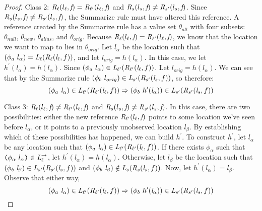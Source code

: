 \begin{proof}
Class 2: $\emph{R}_\ell ( l_\ell,  \emph{f}) = \emph{R}_{\ell^\prime} ( l_\ell,  \emph{f})$ and $\emph{R}_{s} ( l_s,  \emph{f}) \neq \emph{R}_{s^\prime} ( l_s,  \emph{f})$. Since $\emph{R}_{s} ( l_s,  \emph{f}) \neq \emph{R}_{s^\prime} ( l_s,  \emph{f})$, the Summarize rule must have altered this reference. A reference created by the Summarize rule has a value set $\theta_{all}$ with four subsets: $\theta_{null}$, $\theta_{new}$, $\theta_{alias}$, and $\theta_{orig}$. Because $\emph{R}_\ell ( l_\ell,  \emph{f}) = \emph{R}_{\ell^\prime} ( l_\ell,  \emph{f})$, we know that the location we want to map to lies in $\theta_{orig}$. Let $l_\alpha$ be the location such that ${(\phi_a\ l_\alpha)} = \cfgnt{L}_{\ell}(\cfgnt{R}_{\ell} (\cfgnt{l}_\ell,f )) $, and let $l_{orig} = h(l_\alpha)$. In this case, we let $h^\prime(l_\alpha) = h(l_\alpha)$. Since $(\phi_a\ l_\alpha) \in \emph{L}_{\ell^\prime}(\emph{R}_{\ell^\prime} (\emph{l}_\ell,f ))$. Let $l_{orig} = h(l_\alpha)$. We can see that by the Summarize rule $ (\phi_b\ l_{orig})\in \emph{L}_{s^\prime}(\emph{R}_{s^\prime} (\emph{l}_s,f ))$, so therefore:
$$(\phi_a\ \cfgnt{l}_\alpha) \in \cfgnt{L}_{\ell^\prime}(\cfgnt{R}_{\ell^\prime} (\cfgnt{l}_\ell,f )) \Rightarrow (\phi_b\ h^\prime (\cfgnt{l}_\alpha))\in \cfgnt{L}_{s^\prime}(\cfgnt{R}_{s^\prime} (\cfgnt{l}_s,f ))$$

Class 3: $\emph{R}_\ell ( l_\ell,  \emph{f}) \neq \emph{R}_{\ell^\prime} ( l_\ell,  \emph{f})$ and $\emph{R}_{s} ( l_s,  \emph{f}) \neq \emph{R}_{s^\prime} ( l_s,  \emph{f})$. In this case, there are two possibilities: either the new reference $\emph{R}_{\ell^\prime} ( l_\ell,  \emph{f})$ points to some location we've seen before $l_\alpha$, or it points to a previously unobserved location $l_\beta$. By establishing which of these possibilities has happened, we can build $h^\prime$. To construct $h^\prime$, let $l_\alpha$ be any location such that $(\phi_a\ \cfgnt{l}_\alpha) \in \cfgnt{L}_{\ell^\prime}(\cfgnt{R}_{\ell^\prime} (\cfgnt{l}_\ell,f )) $. If there exists $\phi_\alpha$ such that $\texttt{(} \phi_\alpha\ l_\alpha \texttt{)} \in \emph{L}_{\ell}^\rightarrow $, let $h^\prime(l_\alpha) = h(l_\alpha)$. Otherwise, let $l_\beta$ be the location such that $(\phi_b\ \cfgnt{l}_\beta) \in \cfgnt{L}_{s^\prime}(\cfgnt{R}_{s^\prime} (\cfgnt{l}_s,f )) $ and $(\phi_b\ \cfgnt{l}_\beta) \notin \cfgnt{L}_{s}(\cfgnt{R}_{s} (\cfgnt{l}_s,f )) $. Now, let $h^\prime(l_\alpha) = l_\beta$. Observe that either way,
$$(\phi_a\ \cfgnt{l}_\alpha) \in \cfgnt{L}_{\ell^\prime}(\cfgnt{R}_{\ell^\prime} (\cfgnt{l}_\ell,f )) \Rightarrow (\phi_b\ h^\prime (\cfgnt{l}_\alpha))\in \cfgnt{L}_{s^\prime}(\cfgnt{R}_{s^\prime} (\cfgnt{l}_s,f ))$$


\end{proof}
